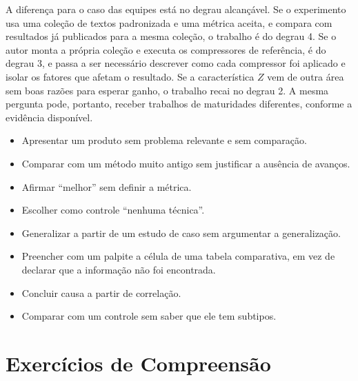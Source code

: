 \documentclass[10pt,a4paper]{extarticle}
\theoremstyle{definition}
\begin{document}
A diferença para o caso das equipes está no degrau alcançável. Se o experimento usa uma coleção de textos padronizada e uma métrica aceita, e compara com resultados já publicados para a mesma coleção, o trabalho é do degrau 4. Se o autor monta a própria coleção e executa os compressores de referência, é do degrau 3, e passa a ser necessário descrever como cada compressor foi aplicado e isolar os fatores que afetam o resultado. Se a característica $Z$ vem de outra área sem boas razões para esperar ganho, o trabalho recai no degrau 2. A mesma pergunta pode, portanto, receber trabalhos de maturidades diferentes, conforme a evidência disponível.

\begin{warnbox}
\begin{itemize}
  \item Apresentar um produto sem problema relevante e sem comparação.
  \item Comparar com um método muito antigo sem justificar a ausência de avanços.
  \item Afirmar \enquote{melhor} sem definir a métrica.
  \item Escolher como controle \enquote{nenhuma técnica}.
  \item Generalizar a partir de um estudo de caso sem argumentar a generalização.
  \item Preencher com um palpite a célula de uma tabela comparativa, em vez de declarar que a informação não foi encontrada.
  \item Concluir causa a partir de correlação.
  \item Comparar com um controle sem saber que ele tem subtipos.
\end{itemize}
\end{warnbox}

\section*{Exercícios de Compreensão}
\end{document}
